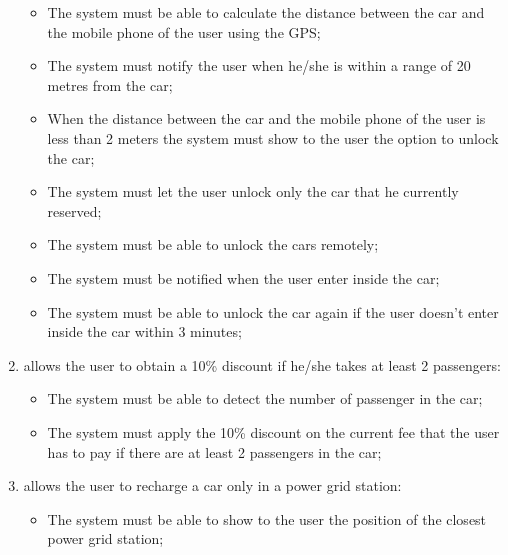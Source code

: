\begin{enumerate}
\begin{itemize}
\item The system must be able to calculate the distance between the car and the mobile phone of the user using the GPS;
\item The system must notify the user when he/she is within a range of 20 metres from the car; %
\item When the distance between the car and the mobile phone of the user is less than 2 meters the system must show to the user the option to unlock the car;
\item The system must let the user unlock only the car that he currently reserved;
\item The system must be able to unlock the cars remotely;
\item The system must be notified when the user enter inside the car;
\item The system must be able to unlock the car again if the user doesn't enter inside the car within 3 minutes;
\end{itemize}

\item allows the user to obtain a 10\% discount if he/she takes at least 2 passengers:

\begin{itemize}
\item The system must be able to detect the number of passenger in the car;
\item The system must apply the 10\% discount on the current fee that the user has to pay if there are at least 2 passengers in the car;
\end{itemize}

\item allows the user to recharge a car only in a power grid station:

\begin{itemize}
\item The system must be able to show to the user the position of the closest power grid station;
\end{itemize}

\end{enumerate}
